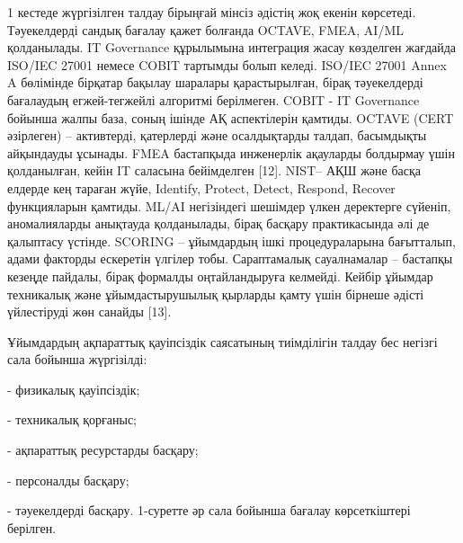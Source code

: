 
\begin{multicols}{2}
1 кестеде жүргізілген талдау бірыңғай мінсіз әдістің жоқ екенін
көрсетеді. Тәуекелдерді сандық бағалау қажет болғанда OCTAVE, FMEA,
AI/ML қолданылады. IT Governance құрылымына интеграция жасау көзделген
жағдайда ISO/IEC 27001 немесе COBIT тартымды болып келеді. ISO/IEC 27001
Annex A бөлімінде бірқатар бақылау шаралары қарастырылған, бірақ
тәуекелдерді бағалаудың егжей-тегжейлі алгоритмі берілмеген. COBIT - IT
Governance бойынша жалпы база, соның ішінде АҚ аспектілерін қамтиды.
OCTAVE (CERT әзірлеген) -- активтерді, қатерлерді және осалдықтарды
талдап, басымдықты айқындауды ұсынады. FMEA бастапқыда инженерлік
ақауларды болдырмау үшін қолданылған, кейін IT саласына бейімделген
{[}12{]}. NIST-- АҚШ және басқа елдерде кең тараған жүйе, Identify,
Protect, Detect, Respond, Recover функцияларын қамтиды. ML/AI
негізіндегі шешімдер үлкен деректерге сүйеніп, аномалияларды анықтауда
қолданылады, бірақ басқару практикасында әлі де қалыптасу үстінде.
SCORING -- ұйымдардың ішкі процедураларына бағытталып, адами факторды
ескеретін үлгілер тобы. Сараптамалық сауалнамалар -- бастапқы кезеңде
пайдалы, бірақ формалды оңтайландыруға келмейді. Кейбір ұйымдар
техникалық және ұйымдастырушылық қырларды қамту үшін бірнеше әдісті
үйлестіруді жөн санайды {[}13{]}.

Ұйымдардың ақпараттық қауіпсіздік саясатының тиімділігін талдау бес
негізгі сала бойынша жүргізілді:

- физикалық қауіпсіздік;

- техникалық қорғаныс;

- ақпараттық ресурстарды басқару;

- персоналды басқару;

- тәуекелдерді басқару.
1-суретте әр сала бойынша бағалау көрсеткіштері берілген.
\end{multicols}

